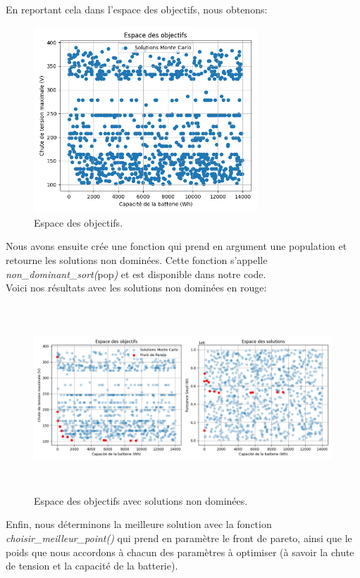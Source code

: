 \documentclass[11pt, a4paper, oneside, portrait]{report}
\begin{document}
            En reportant cela dans l'espace des objectifs, nous obtenons: 

            \begin{figure}[H]
                \centering
                \includegraphics[height=7cm]{espace_objectifs.png}
                \caption{Espace des objectifs.}
            \end{figure}

            Nous avons ensuite crée une fonction qui prend en argument une population et retourne les solutions non dominées. Cette fonction s'appelle \textit{non\_dominant\_sort(}pop\textit{)} et est disponible dans notre code.\\
            
            Voici nos résultats avec les solutions non dominées en rouge:

            \begin{figure}[H]
                \centering
                \includegraphics[height=7cm]{Monte-Carlo_pareto.png}
                \caption{Espace des objectifs avec solutions non dominées.}
            \end{figure}

            Enfin, nous déterminons la meilleure solution avec la fonction \textit{choisir\_meilleur\_point()} qui prend en paramètre le front de pareto, ainsi que le poids que nous accordons à chacun des paramètres à optimiser (à savoir la chute de tension et la capacité de la batterie).\\
            
\end{document}
